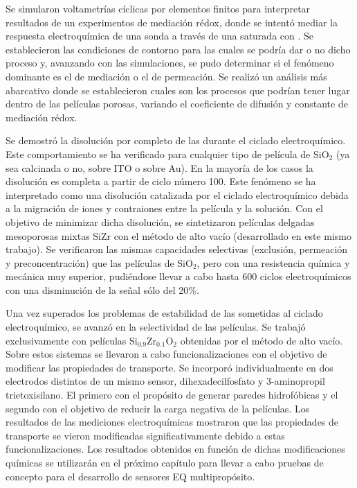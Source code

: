 	Se simularon voltametrías cíclicas por elementos finitos para interpretar resultados de un experimentos de mediación rédox, donde se intentó mediar la respuesta electroquímica de una sonda a través de una \pdm\space saturada con \ru. Se establecieron las condiciones de contorno para las cuales se podría dar o no dicho proceso y, avanzando con las simulaciones, se pudo determinar si el fenómeno dominante es el de mediación o el de permeación. Se realizó un análisis más abarcativo donde se establecieron cuales son los procesos que podrían tener lugar dentro de las películas porosas, variando el coeficiente de difusión y constante de mediación rédox.

	Se demostró la disolución por completo de las \pdmF\space durante el ciclado electroquímico. Este comportamiento se ha verificado para cualquier tipo de película de SiO$_2$ (ya sea calcinada o no, sobre ITO o sobre Au). En la mayoría de los casos la disolución es completa a partir de ciclo número 100. Este fenómeno se ha interpretado como una disolución catalizada por el ciclado electroquímico debida a la migración de iones y contraiones entre la película y la solución. Con el objetivo de minimizar dicha disolución, se sintetizaron películas delgadas mesoporosas mixtas Si\textbar Zr con el método de alto vacío (desarrollado en este mismo trabajo). Se verificaron las mismas capacidades selectivas (exclusión, permeación y preconcentración) que las películas de SiO$_2$, pero con una resistencia química y mecánica muy superior, pudiéndose llevar a cabo hasta 600 ciclos electroquímicos con una disminución de la señal sólo del 20\%.

	Una vez superados los problemas de estabilidad de las \pdm\space sometidas al ciclado electroquímico, se avanzó en la selectividad de las películas. Se trabajó exclusivamente con películas Si$_{0.9}$Zr$_{0.1}$O$_2$ obtenidas por el método de alto vacío. Sobre estos sistemas se llevaron a cabo funcionalizaciones con el objetivo de modificar las propiedades de transporte. Se incorporó individualmente en dos electrodos distintos de un mismo sensor, dihexadecilfosfato y 3-aminopropil trietoxisilano. El primero con el propósito de generar paredes hidrofóbicas y el segundo con el objetivo de reducir la carga negativa de la películas. Los resultados de las mediciones electroquímicas mostraron que las propiedades de transporte se vieron modificadas significativamente debido a estas funcionalizaciones. Los resultados obtenidos en función de dichas modificaciones químicas se utilizarán en el próximo capítulo para llevar a cabo pruebas de concepto para el desarrollo de sensores EQ multipropósito.





